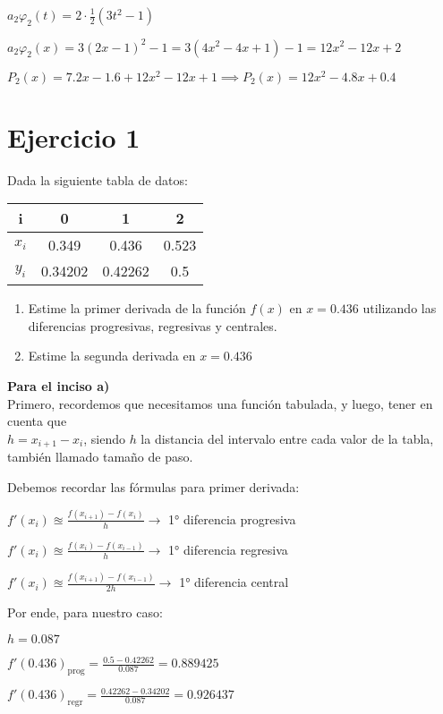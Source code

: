 \documentclass[11pt]{article}
\begin{document}
	$\displaystyle a_2 \varphi_2(t)=2\cdot \frac{1}{2}(3t^2-1)$
	
	$a_2 \varphi_2(x)=3\left(2x-1\right)^2-1=3(4x^2-4x+1)-1=12x^2-12x+2$
	
	$P_2(x)=7.2x-1.6+12x^2-12x+1\implies P_2(x)=12x^2-4.8x+0.4$
	
	\section{Ejercicio 1}
	Dada la siguiente tabla de datos:\\
	\begin{tabular}{|c|c|c|c|}
		\hline
		i & 0 & 1 & 2\\
		\hline
		$x_i$ & 0.349 & 0.436 & 0.523 \\
		\hline
		$y_i$ & 0.34202 & 0.42262 & 0.5 \\
		\hline
	\end{tabular}

	\begin{enumerate}[label=\alph*)]
		\item Estime la primer derivada de la función $f(x)$ en $x=0.436$ utilizando las diferencias progresivas, regresivas y centrales.
		\item Estime la segunda derivada en $x=0.436$
	\end{enumerate}

	\textbf{Para el inciso a)}\\
	Primero, recordemos	que necesitamos una función tabulada, y luego, tener en cuenta que\\ $h=x_{i+1}-x_i$, siendo $h$ la distancia del intervalo entre cada valor de la tabla, también llamado tamaño de paso.
	
	Debemos recordar las fórmulas para primer derivada:
	
	$\displaystyle f'(x_i)\approxeq \frac{f(x_{i+1})-f(x_i)}{h} \rightarrow$ 1° diferencia progresiva
	
	$\displaystyle f'(x_i)\approxeq \frac{f(x_{i})-f(x_{i-1})}{h} \rightarrow$ 1° diferencia regresiva
	
	$\displaystyle f'(x_i)\approxeq \frac{f(x_{i+1})-f(x_{i-1})}{2h} \rightarrow$ 1° diferencia central
	
	Por ende, para nuestro caso:
	
	$h=0.087$
	
	$\displaystyle f'(0.436)_{\text{prog}}=\frac{0.5-0.42262}{0.087}=0.889425$
	
	$\displaystyle f'(0.436)_{\text{regr}}=\frac{0.42262-0.34202}{0.087}=0.926437$
	
\end{document}
